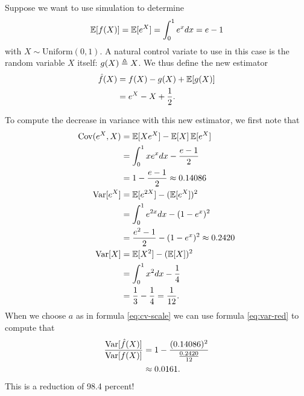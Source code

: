   \begin{example}{\citep{ross2006simulation}}
    Suppose we want to use simulation to determine
    \begin{equation*}
        \operatorname{\mathbb{E}} [ f(X) ] = \operatorname{\mathbb{E}} [ e^X ] = \int_0^1 e^x dx = e - 1
    \end{equation*}
    with $X \sim \text{Uniform}(0,1)$. A natural control variate to use in this case is the random variable $X$ itself: $g(X) \triangleq X$. We thus define the new estimator
    \begin{align*}
      \hat{f}(X)
        &= f(X) - g(X) + \operatorname{\mathbb{E}} [ g(X) ]  \\
        &= e^X - X + \frac{1}{2}.
    \end{align*}

    To compute the decrease in variance with this new estimator, we first note that
    \begin{align*}
      \operatorname{Cov}(e^X, X)
        &= \operatorname{\mathbb{E}} [ Xe^X ] - \operatorname{\mathbb{E}} [ X ]\operatorname{\mathbb{E}} [ e^X ] \\
        &= \int_0^1 xe^x dx - \frac{e-1}{2} \\
        &= 1 - \frac{e-1}{2} \approx 0.14086 \\
      \operatorname{Var} [ e^X ]
        &= \operatorname{\mathbb{E}} [ e^{2X} ] - (\operatorname{\mathbb{E}} [ e^X ])^2 \\
        &= \int_0^1 e^{2x} dx - (1 - e^x)^2 \\
        &= \frac{e^2 - 1}{2}  - (1 - e^x)^2 \approx 0.2420 \\
      \operatorname{Var} [ X ] &= \operatorname{\mathbb{E}} [ X^2 ] - (\operatorname{\mathbb{E}} [ X ])^2 \\
        &= \int_0^1 x^2 dx - \frac{1}{4} \\
        &= \frac{1}{3} - \frac{1}{4} = \frac{1}{12}.
    \end{align*}
    When we choose $a$ as in formula \ref{eq:cv-scale} we can use formula \ref{eq:var-red} to compute that
    \begin{align*}
      \frac{ \operatorname{Var} [ \hat{f}(X) ] }{ \operatorname{Var} [ f(X) ]}
        &= 1 - \frac{(0.14086)^2}{\frac{0.2420}{12}} \\
        &\approx 0.0161.
    \end{align*}
    This is a reduction of 98.4 percent!



\end{example}
